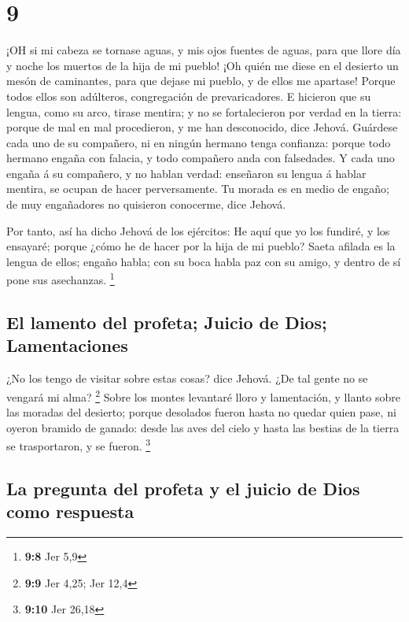 \hypertarget{section-8}{%
\section{9}\label{section-8}}

 ¡OH si mi cabeza se tornase aguas, y mis ojos fuentes de
aguas, para que llore día y noche los muertos de la hija de mi pueblo!
 ¡Oh quién me diese en el desierto un mesón de caminantes,
para que dejase mi pueblo, y de ellos me apartase! Porque todos ellos
son adúlteros, congregación de prevaricadores.  E hicieron
que su lengua, como su arco, tirase mentira; y no se fortalecieron por
verdad en la tierra: porque de mal en mal procedieron, y me han
desconocido, dice Jehová.  Guárdese cada uno de su
compañero, ni en ningún hermano tenga confianza: porque todo hermano
engaña con falacia, y todo compañero anda con falsedades.  Y
cada uno engaña á su compañero, y no hablan verdad: enseñaron su lengua
á hablar mentira, se ocupan de hacer perversamente.  Tu
morada es en medio de engaño; de muy engañadores no quisieron conocerme,
dice Jehová.

 Por tanto, así ha dicho Jehová de los ejércitos: He aquí
que yo los fundiré, y los ensayaré; porque ¿cómo he de hacer por la hija
de mi pueblo?  Saeta afilada es la lengua de ellos; engaño
habla; con su boca habla paz con su amigo, y dentro de sí pone sus
asechanzas. \footnote{\textbf{9:8} Jer 5,9}

\hypertarget{el-lamento-del-profeta-juicio-de-dios-lamentaciones}{%
\subsection{El lamento del profeta; Juicio de Dios;
Lamentaciones}\label{el-lamento-del-profeta-juicio-de-dios-lamentaciones}}

 ¿No los tengo de visitar sobre estas cosas? dice Jehová.
¿De tal gente no se vengará mi alma? \footnote{\textbf{9:9} Jer 4,25;
  Jer 12,4}  Sobre los montes levantaré lloro y
lamentación, y llanto sobre las moradas del desierto; porque desolados
fueron hasta no quedar quien pase, ni oyeron bramido de ganado: desde
las aves del cielo y hasta las bestias de la tierra se trasportaron, y
se fueron. \footnote{\textbf{9:10} Jer 26,18}

\hypertarget{la-pregunta-del-profeta-y-el-juicio-de-dios-como-respuesta}{%
\subsection{La pregunta del profeta y el juicio de Dios como
respuesta}\label{la-pregunta-del-profeta-y-el-juicio-de-dios-como-respuesta}}

